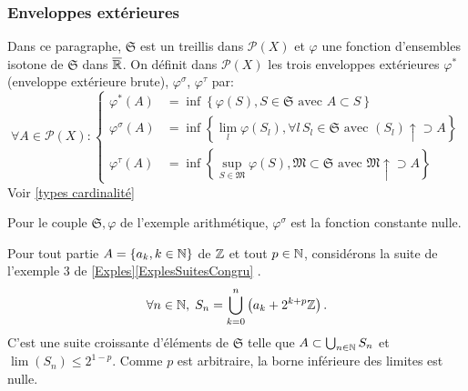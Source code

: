 \subsubsection{Enveloppes extérieures}
Dans ce paragraphe, $\mathfrak{S}$ est un treillis dans $\mathcal{P}(X)$ et $\varphi$ une fonction d'ensembles isotone de $\mathfrak{S}$ dans $\overline{\mathbb{R}}$. On définit dans $\mathcal{P}(X)$ les trois enveloppes extérieures $\varphi^*$ (enveloppe extérieure brute), $\varphi^\sigma$, $\varphi^\tau$ par:
\begin{displaymath}
 \forall A \in  \mathcal{P}(X):
 \left\lbrace
 \begin{aligned}
    \varphi^*(A) &= \inf \left\lbrace \varphi(S), S \in \mathfrak{S} \text{ avec } A \subset S \right\rbrace \\
    \varphi^\sigma(A) &= \inf \left\lbrace \lim_{l}  \varphi(S_l), \forall l \, S_l\in \mathfrak{S} \text{ avec } (S_l) \uparrow \supset A \right\rbrace \\
    \varphi^\tau(A) &= \inf \left\lbrace \sup_{S \in \mathfrak{M}} \varphi(S), \mathfrak{M} \subset \mathfrak{S} \text{ avec } \mathfrak{M}\uparrow \supset A\right\rbrace
 \end{aligned}
 \right.
\end{displaymath}
Voir \ref{types cardinalité}
\begin{prop}
 Pour le couple $\mathfrak{S}, \varphi$ de l'exemple arithmétique, $\varphi^\sigma$ est la fonction constante nulle.
\end{prop}
\begin{demo}
 Pour tout partie $A = \left\lbrace a_k , k \in \mathbb{N}\right\rbrace$ de $\mathbb{Z}$ et tout $p\in \mathbb{N}$, considérons la suite de l'exemple 3 de \ref{Exples}\ref{ExplesSuitesCongru} .
 \begin{displaymath}
  \forall n \in \mathbb{N}, \; S_n = \bigcup_{k =0}^n \left(a_k + 2^{k+p} \mathbb{Z}\right) .
 \end{displaymath}
 C'est une suite croissante d'éléments de $\mathfrak{S}$ telle que $A \subset \bigcup_{n\in \mathbb{N}}S_n$ et $\lim (S_n) \leq 2^{1-p}$. Comme $p$ est arbitraire, la borne inférieure des limites est nulle.

\end{demo}

